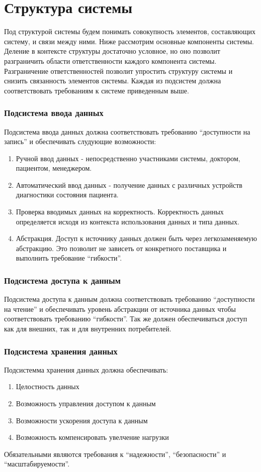 \newpage
\chapter{Структура системы}
Под структурой системы будем понимать совокупность элементов, составляющих
систему, и связи между ними. Ниже рассмотрим основные компоненты системы.
Деление в контексте структуры достаточно условное, но оно позволит разграничить
области ответственности каждого компонента системы. Разграничение
ответственностей позволит упростить структуру системы и снизить связанность
элементов системы. Каждая из подсистем должна соответствовать требованиям к
системе приведенным выше.

\subsection{Подсистема ввода данных}
Подсистема ввода данных должна соответствовать требованию “доступности на
запись” и обеспечивать слудующие возможности:

\begin{enumerate}
  \item Ручной ввод данных - непосредственно участниками системы, доктором,
  пациентом, менеджером.
  \item Автоматический ввод данных - получение данных с различных устройств
  диагностики состояния пациента.
  \item Проверка вводимых данных на корректность. Корректность данных
  определяется исходя из контекста использования данных и типа данных.
  \item Абстракция. Доступ к источнику данных должен быть через легкозаменяемую
  абстракцию. Это позволит не зависеть от конкретного поставщика и выполнить требование “гибкости”.
\end{enumerate}

\subsection{Подсистема доступа к данным}
Подсистема доступа к данным должна соответствовать требованию “доступности на
чтение” и обеспечивать уровень абстракции от источника данных чтобы
соответствовать требованию “гибкости”. Так же должен обеспечиваться доступ как
для внешних, так и для внутренних потребителей.

\subsection{Подсистема хранения данных}
Подсистемма хранения данных должна обеспечивать:
\begin{enumerate}
  \item Целостность данных
  \item Возможность управления доступом к данным
  \item Возможности ускорения доступа к данным
  \item Возможность компенсировать увелчение нагрузки
\end{enumerate}
Обязательными являются требования к “надежности”, “безопасности” и
“масштабируемости”.


